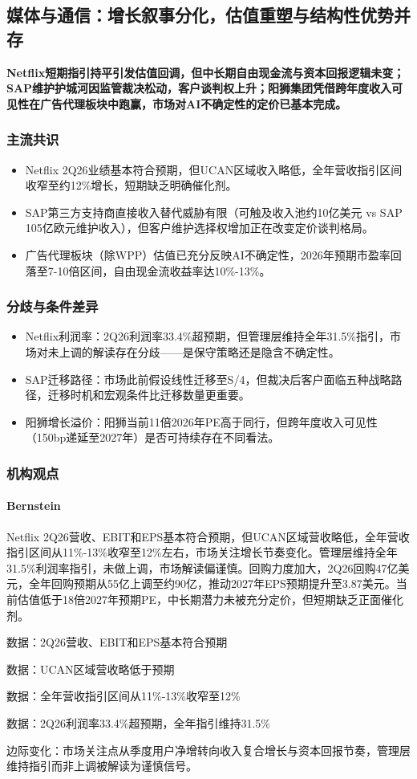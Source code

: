 \documentclass[11pt]{ctexart}
\begin{document}
\subsection{媒体与通信：增长叙事分化，估值重塑与结构性优势并存}
\textbf{Netflix短期指引持平引发估值回调，但中长期自由现金流与资本回报逻辑未变；SAP维护护城河因监管裁决松动，客户谈判权上升；阳狮集团凭借跨年度收入可见性在广告代理板块中跑赢，市场对AI不确定性的定价已基本完成。}
\subsubsection*{主流共识}
\begin{itemize}
  \item Netflix 2Q26业绩基本符合预期，但UCAN区域收入略低，全年营收指引区间收窄至约12\%增长，短期缺乏明确催化剂。
  \item SAP第三方支持商直接收入替代威胁有限（可触及收入池约10亿美元 vs SAP 105亿欧元维护收入），但客户维护选择权增加正在改变定价谈判格局。
  \item 广告代理板块（除WPP）估值已充分反映AI不确定性，2026年预期市盈率回落至7-10倍区间，自由现金流收益率达10\%-13\%。
\end{itemize}
\subsubsection*{分歧与条件差异}
\begin{itemize}
  \item Netflix利润率：2Q26利润率33.4\%超预期，但管理层维持全年31.5\%指引，市场对未上调的解读存在分歧——是保守策略还是隐含不确定性。
  \item SAP迁移路径：市场此前假设线性迁移至S/4，但裁决后客户面临五种战略路径，迁移时机和宏观条件比迁移数量更重要。
  \item 阳狮增长溢价：阳狮当前11倍2026年PE高于同行，但跨年度收入可见性（150bp递延至2027年）是否可持续存在不同看法。
\end{itemize}
\subsubsection*{机构观点}
\paragraph{Bernstein} Netflix 2Q26营收、EBIT和EPS基本符合预期，但UCAN区域营收略低，全年营收指引区间从11\%-13\%收窄至12\%左右，市场关注增长节奏变化。管理层维持全年31.5\%利润率指引，未做上调，市场解读偏谨慎。回购力度加大，2Q26回购47亿美元，全年回购预期从55亿上调至约90亿，推动2027年EPS预期提升至3.87美元。当前估值低于18倍2027年预期PE，中长期潜力未被充分定价，但短期缺乏正面催化剂。
{\small\color{refgray}数据：2Q26营收、EBIT和EPS基本符合预期\par}
{\small\color{refgray}数据：UCAN区域营收略低于预期\par}
{\small\color{refgray}数据：全年营收指引区间从11\%-13\%收窄至12\%\par}
{\small\color{refgray}数据：2Q26利润率33.4\%超预期，全年指引维持31.5\%\par}
{\small\color{refgray}边际变化：市场关注点从季度用户净增转向收入复合增长与资本回报节奏，管理层维持指引而非上调被解读为谨慎信号。\par}
\end{document}
